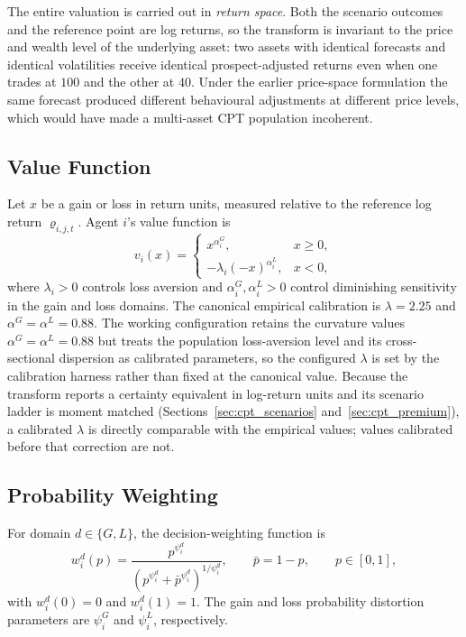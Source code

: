 \documentclass[12pt, a4paper]{article}
\begin{document}
    The entire valuation is carried out in \emph{return space}. Both the scenario
    outcomes and the reference point are log returns, so the transform is
    invariant to the price and wealth level of the underlying asset: two assets
    with identical forecasts and identical volatilities receive identical
    prospect-adjusted returns even when one trades at \(100\) and the other at
    \(40\). Under the earlier price-space formulation the same forecast produced
    different behavioural adjustments at different price levels, which would have
    made a multi-asset CPT population incoherent.

    \subsection{Value Function}

    Let \(x\) be a gain or loss in return units, measured relative to the
    reference log return \(\varrho_{i,j,t}\). Agent \(i\)'s value function is
    \[
        v_i(x)=
        \begin{cases}
            x^{\alpha_i^G}, & x\ge 0,\\[0.8ex]
            -\lambda_i{\left(-x\right)}^{\alpha_i^L}, & x<0,
        \end{cases}
    \]
    where \(\lambda_i>0\) controls loss aversion and
    \(\alpha_i^G,\alpha_i^L>0\) control diminishing sensitivity in the gain and
    loss domains. The canonical empirical calibration is
    \(\lambda=2.25\) and \(\alpha^G=\alpha^L=0.88\). The working configuration
    retains the curvature values \(\alpha^G=\alpha^L=0.88\) but treats the
    population loss-aversion level and its cross-sectional dispersion as
    calibrated parameters, so the configured \(\lambda\) is set by the
    calibration harness rather than fixed at the canonical value. Because the
    transform reports a certainty equivalent in log-return units and its
    scenario ladder is moment matched (Sections~\ref{sec:cpt_scenarios}
    and~\ref{sec:cpt_premium}), a calibrated \(\lambda\) is directly comparable
    with the empirical values; values calibrated before that correction are not.

    \subsection{Probability Weighting}

    For domain \(d\in\{G,L\}\), the decision-weighting function is
    \[
        w_i^d(p)=
        \frac{p^{\psi_i^d}}
        {{\left(p^{\psi_i^d}+\bar p^{\psi_i^d}\right)}^{1/\psi_i^d}},
        \qquad
        \bar p=1-p,
        \qquad p\in[0,1],
    \]
    with \(w_i^d(0)=0\) and \(w_i^d(1)=1\). The gain and loss probability
    distortion parameters are \(\psi_i^G\) and \(\psi_i^L\), respectively.
\end{document}
